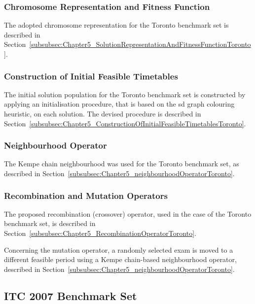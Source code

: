 \subsubsection{Chromosome Representation and Fitness Function}

The adopted chromosome representation for the Toronto benchmark set is described in Section~\ref{subsubsec:Chapter5_SolutionRepresentationAndFitnessFunctionToronto}.


\subsubsection{Construction of Initial Feasible Timetables}

The initial solution population for the Toronto benchmark set is constructed by applying an initialisation procedure, that is based on the \gls{sd} graph colouring heuristic, on each solution. The devised procedure is described in Section~\ref{subsubsec:Chapter5_ConstructionOfInitialFeasibleTimetablesToronto}.


\subsubsection{Neighbourhood Operator}

The Kempe chain neighbourhood was used for the Toronto benchmark set, as described in Section~\ref{subsubsec:Chapter5_neighbourhoodOperatorToronto}.


\subsubsection{Recombination and Mutation Operators}
\label{sec:RecombinationMutationOperatorsToronto}

The proposed recombination (crossover) operator, used in the case of the Toronto benchmark set, is described in Section~\ref{subsubsec:Chapter5_RecombinationOperatorToronto}.

Concerning the mutation operator, a randomly selected exam is moved to a different feasible period using a Kempe chain-based neighbourhood operator, described in Section~\ref{subsubsec:Chapter5_neighbourhoodOperatorToronto}.





\subsection{ITC 2007 Benchmark Set}
\label{subsec:Chapter6_ApplicationToITC2007}


